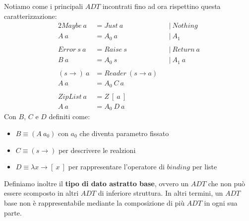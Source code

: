 Notiamo come i principali $ADT$ incontrati fino ad ora rispettino questa caratterizzazione:
\begin{alignat*}{2}
  Maybe\ a &= Just\ a\ &&|\ Nothing\\
  A\ a &= A_0\ a\ &&|\ A_1 \\\\
  Error\ s\ a &= Raise\ s\ &&|\ Return\ a\\
  B\ a &= A_0\ s\ &&|\ A_1\ a\\\\
  (s \to)\ a &= Reader\ (s \to a)\\
  A\ a &= A_0\ C\ a\\\\
  ZipList\ a &= Z\ [\ a\ ]\\
  A\ a &= A_0\ D\ a
\end{alignat*}
Con $B$, $C$ e $D$ definiti come:
\begin{itemize}
  \item $B \equiv (A\ a_0)$ con $a_0$ che diventa parametro fissato
  \item $C \equiv (s \to)$ per descrivere le realzioni
  \item $D \equiv \lambda x \to [\ x\ ]$ per rappresentare l'operatore di $binding$ per liste
\end{itemize}

Definiamo inoltre il \textbf{tipo di dato astratto base}, ovvero un $ADT$ che non può essere
scomposto in altri $ADT$ di inferiore struttura.
In altri termini, un $ADT$ base non è rappresentabile mediante la composizione di
più $ADT$ in ogni sua parte.\newline

\setlength{\fboxsep}{1em}
\\\\

